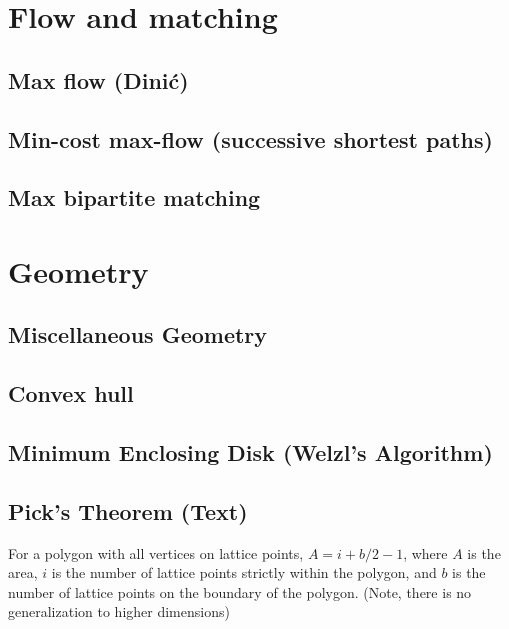 \documentclass[12pt]{extarticle}
\begin{document}
\begin{multicols*}{3}
\setlength{\parskip}{0.0in}
\tableofcontents
\setlength{\parskip}{0.1in}
\section{Flow and matching}

\subsection{Max flow (Dini\'c)} %


\subsection{Min-cost max-flow (successive shortest paths)}


\subsection{Max bipartite matching} %





\section{Geometry}

\subsection{Miscellaneous Geometry} %



\subsection{Convex hull} %


\subsection{Minimum Enclosing Disk (Welzl's Algorithm)} 


\subsection{Pick's Theorem (Text)} %
For a polygon with all vertices on lattice points, $A = i + b/2 - 1$, where $A$
is the area, $i$ is the number of lattice points strictly within the polygon,
and $b$ is the number of lattice points on the boundary of the polygon. (Note,
there is no generalization to higher dimensions)


\end{multicols*}
\end{document}
